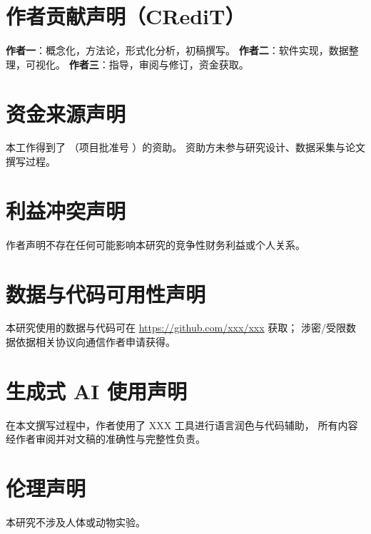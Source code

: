 
\section*{作者贡献声明（CRediT）}

\textbf{作者一}：概念化，方法论，形式化分析，初稿撰写。
\textbf{作者二}：软件实现，数据整理，可视化。
\textbf{作者三}：指导，审阅与修订，资金获取。

\section*{资金来源声明}

本工作得到了 \fundingname（项目批准号 \fundingnumber）的资助。
资助方未参与研究设计、数据采集与论文撰写过程。

\section*{利益冲突声明}

作者声明不存在任何可能影响本研究的竞争性财务利益或个人关系。

\section*{数据与代码可用性声明}

本研究使用的数据与代码可在 \url{https://github.com/xxx/xxx} 获取；
涉密/受限数据依据相关协议向通信作者申请获得。

\section*{生成式 AI 使用声明}

在本文撰写过程中，作者使用了 XXX 工具进行语言润色与代码辅助，
所有内容经作者审阅并对文稿的准确性与完整性负责。

\section*{伦理声明}

本研究不涉及人体或动物实验。
